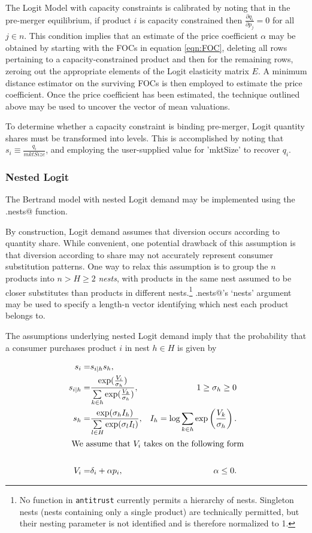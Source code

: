 \documentclass[11pt,numbers=noenddot,pointlessnumbers]{scrreprt}
\newcommand{\atr}{{\tt antitrust}}
\numberwithin{equation}{section}
\begin{document}
The Logit Model with capacity constraints is calibrated by noting that
in the pre-merger equilibrium, if product $i$ is capacity constrained
then $\frac{\partial q_i}{\partial p_j}=0$ for all $j \in n$. This
condition implies that an estimate of the price coefficient $\alpha$
may be obtained by starting with the FOCs in equation \ref{eqn:FOC},
deleting all rows pertaining to a capacity-constrained product and
then for the remaining rows, zeroing out the appropriate elements of
the Logit elasticity matrix $E$. A minimum distance estimator on the
surviving FOCs is then employed to estimate the price
coefficient. Once the price coefficient has been estimated, the
technique outlined above may be used to uncover the vector of mean valuations.

To determine whether a capacity constraint is binding pre-merger,
Logit quantity shares must be transformed into
levels. This is accomplished by noting that $s_i\equiv\frac{q_i
}{mktSize}$, and employing the user-supplied value for 'mktSize' to
recover $q_i$.




\subsubsection{Nested Logit}
The Bertrand model with nested Logit demand may be implemented using the
\verb@logit.nests@ function.

By construction, Logit demand assumes that diversion occurs
according to quantity share. While convenient, one potential drawback of this
assumption is that diversion according to share may not accurately
represent consumer substitution patterns. One way to relax this
assumption is to group the $n$ products
into $n > H \ge 2$ \emph{nests}, with
products in the same nest assumed to be closer substitutes than
products in different nests.\footnote{No function in \atr{} currently permits
  a hierarchy of nests. Singleton nests (nests containing only a
  single product) are technically permitted,
  but their nesting parameter is not identified and is therefore
  normalized to 1.}
\verb@logit.nests@'s `nests' argument may be used to specify a length-n vector identifying which nest each
product belongs to.


The assumptions underlying
nested Logit demand imply that the probability that a consumer
purchases product $i$ in nest $h\in H$ is given by

\begin{align*}
  s_i=& s_{i|h}s_h,&\\
  s_{i|h}=&\frac{\exp(\frac{V_i}{\sigma_h})}{\sum\limits_{k \in
      h}\exp(\frac{V_k}{\sigma_h})},& 1 \ge \sigma_h \ge 0\\
  s_{h}=& \frac{\exp(\sigma_hI_h)}{\sum\limits_{l\in H}\exp(\sigma_lI_l)},& I_h=\log\sum\limits_{k \in h}\exp\left(\frac{V_k}{\sigma_h}\right).\\
  \intertext{ We assume that $V_i$ takes on the following form}\\
  V_i=&\delta_i + \alpha p_i,& \alpha\le 0.
\end{align*}
\end{document}
